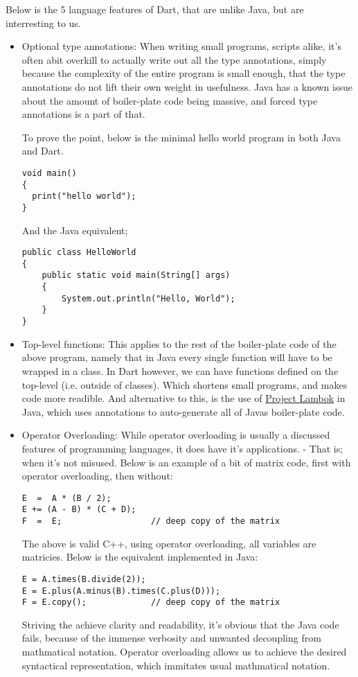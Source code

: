 Below is the 5 language features of Dart, that are unlike Java, but are interresting to us.
\begin{itemize}
\item Optional type annotations: When writing small programs, scripts alike,
it's often abit overkill to actually write out all the type annotations, simply because the complexity of the entire program is small enough, that the type annotations do not lift their own weight in usefulness.
Java has a known issue about the amount of boiler-plate code being massive, and forced type annotations is a part of that.

To prove the point, below is the minimal hello world program in both Java and Dart.
\begin{verbatim}
void main()
{
  print("hello world");
}
\end{verbatim}
And the Java equivalent;
\begin{verbatim}
public class HelloWorld
{
    public static void main(String[] args)
    {
        System.out.println("Hello, World");
    }
}
\end{verbatim}

\item Top-level functions: This applies to the rest of the boiler-plate code of the above program, namely that in Java every single function will have to be wrapped in a class.
In Dart however, we can have functions defined on the top-level (i.e. outside of classes). Which shortens small programs, and makes code more readible.
And alternative to this, is the use of \href{http://projectlombok.org}{Project Lambok} in Java, which uses annotations to auto-generate all of Javas boiler-plate code.

\item Operator Overloading: While operator overloading is usually a discussed features of programming languages, it does have it's applications. - That is; when it's not misused.
Below is an example of a bit of matrix code, first with operator overloading, then without:
\begin{verbatim}
E  =  A * (B / 2);
E += (A - B) * (C + D);
F  =  E;                  // deep copy of the matrix
\end{verbatim}
The above is valid C++, using operator overloading, all variables are matricies. Below is the equivalent implemented in Java: 
\begin{verbatim}
E = A.times(B.divide(2));
E = E.plus(A.minus(B).times(C.plus(D)));
F = E.copy();             // deep copy of the matrix
\end{verbatim}
Striving the achieve clarity and readability, it's obvious that the Java code fails, because of the immense verbosity and unwanted decoupling from mathmatical notation.
Operator overloading allows us to achieve the desired syntactical representation, which immitates usual mathmatical notation.


\end{itemize}

